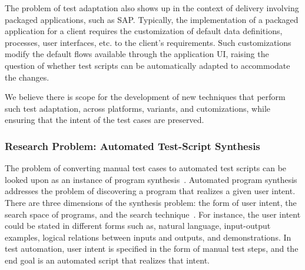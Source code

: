 
The problem of test adaptation also shows up in the context of delivery
involving packaged applications, such as SAP. Typically, the implementation of a
packaged application for a client requires the customization of default data
definitions, processes, user interfaces, etc. to the client's requirements. Such
customizations modify the default flows available through the application UI,
raising the question of whether test scripts can be automatically adapted to
accommodate the changes.

We believe there is scope for the development of new techniques that perform
such test adaptation, across platforms, variants, and cutomizations, while
ensuring that the intent of the test cases are preserved.

\subsubsection*{Research Problem: Automated Test-Script Synthesis}

The problem of converting manual test cases to automated test scripts can be
looked upon as an instance of program synthesis~\cite{Gulwani:2010}.  Automated
program synthesis addresses the problem of discovering a program that realizes a
given user intent. There are three dimensions of the synthesis problem: the form
of user intent, the search space of programs, and the search
technique~\cite{Gulwani:2010}. For instance, the user intent could be stated in
different forms such as, natural language, input-output examples, logical
relations between inputs and outputs, and demonstrations. In test automation,
user intent is specified in the form of manual test steps, and the end goal is
an automated script that realizes that intent.


